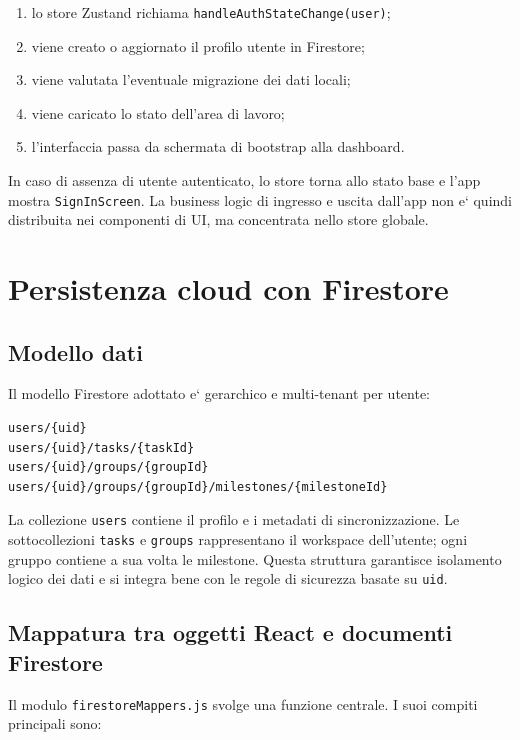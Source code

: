 \documentclass[11pt,a4paper]{article}
\begin{document}
\begin{enumerate}
  \item lo store Zustand richiama \texttt{handleAuthStateChange(user)};
  \item viene creato o aggiornato il profilo utente in Firestore;
  \item viene valutata l'eventuale migrazione dei dati locali;
  \item viene caricato lo stato dell'area di lavoro;
  \item l'interfaccia passa da schermata di bootstrap alla dashboard.
\end{enumerate}

In caso di assenza di utente autenticato, lo store torna allo stato base e l'app mostra \texttt{SignInScreen}. La business logic di ingresso e uscita dall'app non e` quindi distribuita nei componenti di UI, ma concentrata nello store globale.

\section{Persistenza cloud con Firestore}

\subsection{Modello dati}

Il modello Firestore adottato e` gerarchico e multi-tenant per utente:

\begin{lstlisting}
users/{uid}
users/{uid}/tasks/{taskId}
users/{uid}/groups/{groupId}
users/{uid}/groups/{groupId}/milestones/{milestoneId}
\end{lstlisting}

La collezione \texttt{users} contiene il profilo e i metadati di sincronizzazione. Le sottocollezioni \texttt{tasks} e \texttt{groups} rappresentano il workspace dell'utente; ogni gruppo contiene a sua volta le milestone. Questa struttura garantisce isolamento logico dei dati e si integra bene con le regole di sicurezza basate su \texttt{uid}.

\subsection{Mappatura tra oggetti React e documenti Firestore}

Il modulo \texttt{firestoreMappers.js} svolge una funzione centrale. I suoi compiti principali sono:
\end{document}
